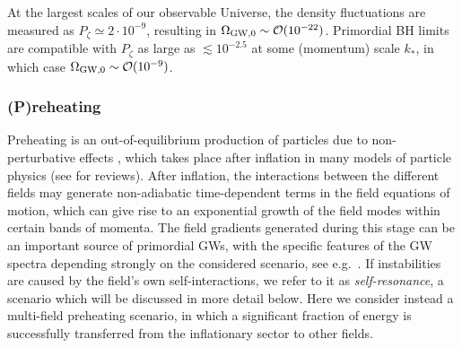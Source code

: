 \documentclass[11pt,a4paper]{article}
\begin{document}
At the largest scales of our observable Universe, the density fluctuations are measured as $P_\zeta \simeq 2 \cdot 10^{-9}$, resulting in $\Omega_{\text{GW},0} \sim  {\cal O}(10^{-22})$. Primordial BH limits are compatible with $P_\zeta$ as large as $\lesssim 10^{-2.5}$ at some (momentum) scale $k_*$, in which case $\Omega_{\text{GW},0} \sim  {\cal O} (10^{-9})$.

\subsubsection{(P)reheating}
\label{sec:Preheating}

Preheating is an out-of-equilibrium production of particles due to non-perturbative effects \cite{Traschen:1990sw,Kofman:1994rk,Shtanov:1994ce,Kaiser:1995fb,Khlebnikov:1996mc,Prokopec:1996rr,Kaiser:1997mp,Kofman:1997yn,Greene:1997fu,Kaiser:1997hg}, which takes place after inflation in many models of particle physics (see \cite{Allahverdi:2010xz,Amin:2014eta,Lozanov:2019jxc} for reviews).  After inflation, the interactions between the different fields may generate non-adiabatic time-dependent terms in the field equations of motion, which can give rise to an exponential growth of the field modes within certain bands of momenta. The field gradients generated during this stage can be an important source of primordial GWs, with the specific features of the GW spectra depending strongly on the considered scenario, see e.g.~\cite{Khlebnikov:1997di,GarciaBellido:1998gm,Easther:2006gt,Easther:2006vd,GarciaBellido:2007dg,GarciaBellido:2007af,Dufaux:2007pt,Dufaux:2008dn,Figueroa:2011ye}. If instabilities are caused by the field's own self-interactions, we refer to it as \textit{self-resonance}, a scenario which will be discussed in more detail below. Here we consider instead a multi-field preheating scenario, in which a significant fraction of energy is successfully transferred from the inflationary sector to other fields.
\end{document}
